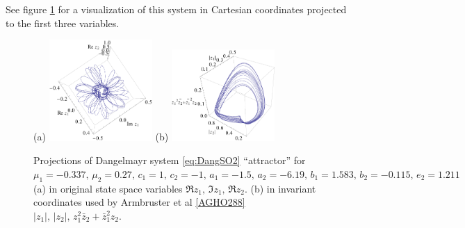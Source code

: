 \documentclass{article}
\begin{document}
See figure \ref{fig:dangelmayrChaos} for a visualization of this system in Cartesian coordinates projected to the first three variables.
\begin{figure}
\centering
 (a) \includegraphics[width=0.35\textwidth]{dangelmayrZ}
 (b) \includegraphics[width=0.35\textwidth]{dangelmayrAGH}
\caption{Projections of Dangelmayr system \ref{eq:DangSO2}
``attractor'' for $\mu_1 = -0.337,\, \mu_2 = 0.27,\, c_1 = 1,\, c_2 =
-1,\, a_1 = -1.5,\, a_2 = -6.19,\, b_1 = 1.583,\,  b_2 = -0.115,\, e_2 =
1.211$
(a) in original state space variables $\Re z_1,\,\Im z_1,\,\Re z_2$.
(b) in invariant coordinates used by
Armbruster et al \ref{AGHO288} $|z_1|,\, |z_2|,\, z_1^2 \bar{z}_2 + \bar{z}_1^2 z_2$.
}
 \label{fig:dangelmayrChaos}
\end{figure}
\end{document}
